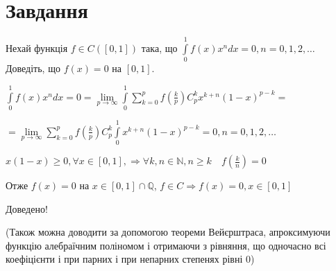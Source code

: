 
\chapter{Завдання \theHchapter}

\begin{tcolorbox}[title=Завдання]
    Нехай функція $f \in C([0,1])$ така, що 
    $\int\limits_0^1 f(x) x^n d x=0, n=0,1,2, \ldots$ 
    Доведіть, що $f(x)=0$ на $[0,1]$.
\end{tcolorbox}



$\int\limits_0^1 f(x) x^n d x=0 = \lim\limits_{p\rightarrow \infty}
\int\limits_0^1 \sum\limits_{k = 0}^p 
f(\frac{k}{p})C_p^kx^{k+n}(1 - x)^{p - k}=$


$=
\lim\limits_{p\rightarrow \infty}
\sum\limits_{k = 0}^p f(\frac{k}{p})C_p^k
\int\limits_0^1 x^{k+n}(1 - x)^{p - k}=
0, n = 0, 1, 2,\dots 
$ 


$
x(1 - x) \geq 0, \forall x \in [0, 1], \Rightarrow
\forall k, n \in \mathbb{N}, n \geq k \quad f(\frac{k}{n}) = 0
$


Отже $f(x) = 0$ на $x \in [0, 1]\cap \mathbb{Q}$,
\quad $f \in C  \Rightarrow f(x) = 0, x \in [0, 1]$  


Доведено!



(Також можна доводити за допомогою теореми Вейєрштраса, апроксимуючи
функцію алебраїчним поліномом і отримаючи з рівняння, що одночасно всі 
коефіцієнти і при парних і при непарних степенях рівні 0)